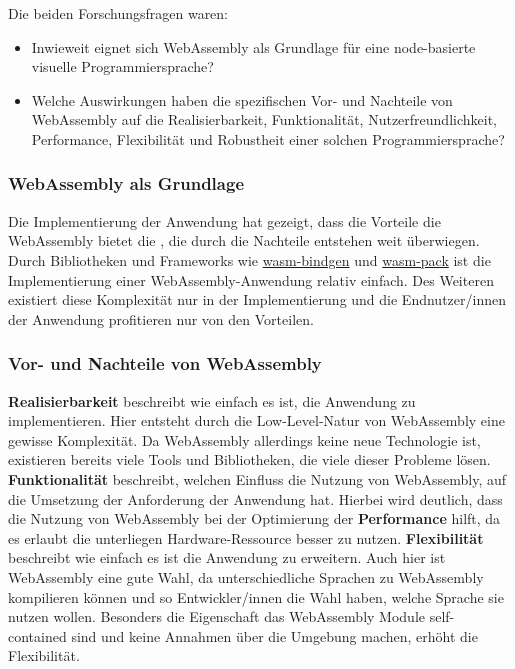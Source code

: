 \documentclass[ngerman]{article}
\begin{document}
Die beiden Forschungsfragen waren:

\begin{itemize}
  \item Inwieweit eignet sich WebAssembly als Grundlage für eine node-basierte visuelle Programmiersprache?  
  \item Welche Auswirkungen haben die spezifischen Vor- und Nachteile von WebAssembly auf die Realisierbarkeit, Funktionalität, Nutzerfreundlichkeit, Performance, Flexibilität und Robustheit einer solchen Programmiersprache?
\end{itemize}

\subsubsection{WebAssembly als Grundlage}
Die Implementierung der Anwendung hat gezeigt, dass die Vorteile die WebAssembly bietet die , die durch die Nachteile entstehen weit überwiegen. Durch Bibliotheken und Frameworks wie \href{https://rustwasm.github.io/wasm-bindgen/}{wasm-bindgen} und \href{https://rustwasm.github.io/wasm-pack/book/}{wasm-pack} ist die Implementierung einer WebAssembly-Anwendung relativ einfach. 
\br
Des Weiteren existiert diese Komplexität nur in der Implementierung und die Endnutzer/innen der Anwendung profitieren nur von den Vorteilen.

\subsubsection{Vor- und Nachteile von WebAssembly}
\textbf{Realisierbarkeit} beschreibt wie einfach es ist, die Anwendung zu implementieren. Hier entsteht durch die Low-Level-Natur von WebAssembly eine gewisse Komplexität. 
Da WebAssembly allerdings keine neue Technologie ist, existieren bereits viele Tools und Bibliotheken, die viele dieser Probleme lösen.
\br
\textbf{Funktionalität} beschreibt, welchen Einfluss die Nutzung von WebAssembly, auf die Umsetzung der Anforderung der Anwendung hat. Hierbei wird deutlich, dass die Nutzung von WebAssembly bei der Optimierung der \textbf{Performance} hilft, da es erlaubt die unterliegen Hardware-Ressource besser zu nutzen.
\br
\textbf{Flexibilität} beschreibt wie einfach es ist die Anwendung zu erweitern. Auch hier ist WebAssembly eine gute Wahl, da unterschiedliche Sprachen zu WebAssembly kompilieren können und so Entwickler/innen die Wahl haben, welche Sprache sie nutzen wollen. Besonders die Eigenschaft das WebAssembly Module self-contained sind und keine Annahmen über die Umgebung machen, erhöht die Flexibilität.
\end{document}
